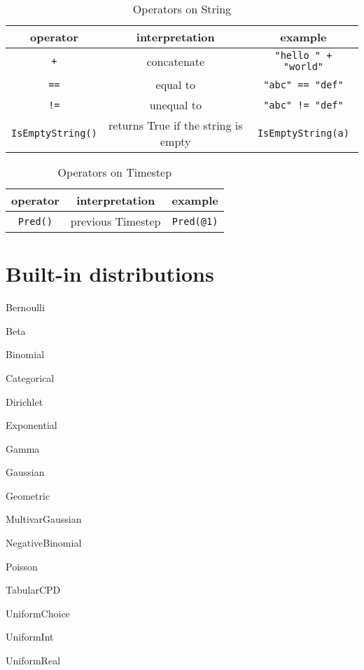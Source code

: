 \documentclass[12pt]{article}
\begin{document}
\begin{table}[h!]
\centering
\caption{Operators on String}
\begin{tabular}{ c c c }
\toprule 
operator & interpretation & example \\
\midrule
{\tt +} & concatenate & \verb|"hello " + "world"|  \\ 
{\tt ==} & equal to & \verb|"abc" == "def"|  \\
{\tt !=} & unequal to & \verb|"abc" != "def"|\\ 
\verb|IsEmptyString()| & returns True if the string is empty & \verb|IsEmptyString(a)| \\
\bottomrule
\end{tabular}
\end{table}

\begin{table}[h!]
\centering
\caption{Operators on Timestep}
\begin{tabular}{ c c c }
\toprule 
operator & interpretation & example \\
\midrule
\verb|Pred()| & previous Timestep & \verb|Pred(@1)|  \\
\bottomrule
\end{tabular}
\end{table}

\section{Built-in distributions}
\begin{itemize*}
\item Bernoulli
\item Beta
\item Binomial
\item Categorical
\item Dirichlet
\item Exponential
\item Gamma
\item Gaussian
\item Geometric
\item MultivarGaussian
\item NegativeBinomial
\item Poisson
\item TabularCPD
\item UniformChoice
\item UniformInt
\item UniformReal
\end{itemize*}
\end{document}
